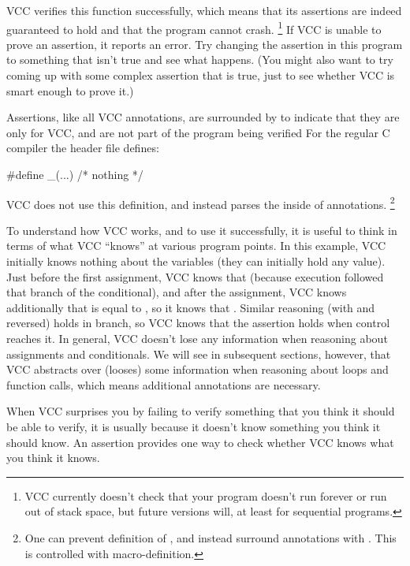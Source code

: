 VCC verifies this function successfully, which means that its
assertions are indeed guaranteed to hold and that the program cannot
crash.%
\footnote{
  VCC currently doesn't check that your program doesn't run forever or
  run out of stack space, but future versions will, at least for sequential
  programs.  
}
If VCC is unable
to prove an assertion, it reports an error.  Try changing the
assertion in this program to something that isn't true and see what
happens. (You might also want to try coming up with some complex
assertion that is true, just to see whether VCC is smart enough to
prove it.)

Assertions, like all VCC annotations, 
are surrounded by  to indicate that they are
only for VCC, and are not part of the program being verified
For the regular C compiler the  header file defines:
\begin{VCC}
#define _(...) /* nothing */
\end{VCC}
VCC does not use this definition, and instead parses the inside of 
annotations.%
\footnote{
  One can prevent definition of \vcc{_}, and instead surround annotations with
  .
  This is controlled with  macro-definition.}

To understand how VCC works, and to use it successfully, it is useful to
think in terms of what VCC ``knows'' at various program points. In
this example, VCC initially knows nothing about the variables (they
can initially hold any value). Just before the first assignment, VCC knows that 
 (because execution followed that branch of the conditional), and
after the assignment, VCC knows additionally that  is equal to
, so it knows that . Similar reasoning
(with  and  reversed) holds in  branch, so VCC
knows that the assertion holds when control reaches it. In general,
VCC doesn't lose any information when reasoning about assignments and
conditionals. We will see in subsequent sections, however, that VCC
abstracts over (looses) some information when reasoning about loops and function calls,
which means additional annotations are necessary.

When VCC surprises you by failing to verify something that you think
it should be able to verify, it is usually because it doesn't know
something you think it should know. An assertion provides one way to
check whether VCC knows what you think it knows.

